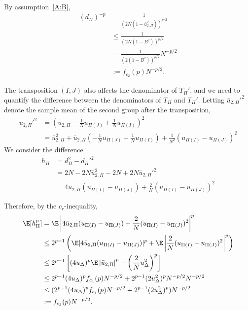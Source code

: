 By assumption~\eqref{A:B},
\begin{align}
  (d_{\Pi})^{-p} &= \frac{1}{(2N(1-\bar{u}_{2,\Pi}^2))^{p/2}} \nonumber \\
  &\leq \frac{1}{(2N(1-B^2))^{p/2}} \nonumber \\
  &= \frac{1}{(2(1-B^2))^{p/2}}N^{-p/2} \nonumber \\
  &:= f_{c_2}(p) N^{-p/2} \label{def:dp}.
\end{align}

The transposition $(I, J)$ also affects the denominator of $T_{\Pi}'$, and we need to quantify the
difference between the denominators of $T_{\Pi}$ and $T_{\Pi}'$.  Letting $\bar{u}_{2,\Pi}'^2$
denote the sample mean of the second group after the transposition,
\begin{align*}
  \bar{u}_{2,\Pi}'^2 &= \left ( \bar{u}_{2,\Pi}-\frac{1}{N}u_{\Pi(J)}+\frac{1}{N}u_{\Pi(I)} \right )^2 \\
  &= \bar{u}_{2,\Pi}^2 + \bar{u}_{2,\Pi} \left ( -\frac{1}{N}u_{\Pi(J)} +
      \frac{1}{N}u_{\Pi(I)} \right ) + \frac{1}{N^2}(u_{\Pi(I)} - u_{\Pi(J)})^2
\end{align*}
We consider the difference
\begin{align*}
  h_{\Pi} &= d_{\Pi}^2 - d_{\Pi}'^2 \\
  &= 2N - 2N \bar{u}_{2,\Pi}^2 - 2N + 2N\bar{u}_{2,\Pi}'^2 \\
  &= 4\bar{u}_{2,\Pi}(u_{\Pi(I)} - u_{\Pi(J)}) + \frac{2}{N}(u_{\Pi(I)} - u_{\Pi(J)})^2
\end{align*}

Therefore, by the $c_r$-inequality,
\begin{align}
  \E[h_{\Pi}^p] &= \E \left | 4\bar{u}_{2,\Pi}(u_{\Pi(I)}-u_{\Pi(J)}) +
      \frac{2}{N}(u_{\Pi(I)}-u_{\Pi(J)})^2 \right |^p \nonumber \\
  &\leq 2^{p-1} \left ( \E |4\bar{u}_{2,\Pi}(u_{\Pi(I)}-u_{\Pi(J)})|^p 
    + \E \left |\frac{2}{N}(u_{\Pi(I)}-u_{\Pi(J)})^2 \right |^p \right ) \nonumber \\
  &\leq 2^{p-1}\left [ (4u_{\Delta})^p \E \left | \bar{u}_{2,\Pi} \right |^p
    + \left ( \frac{2}{N}u_{\Delta}^2 \right )^p \right ] \nonumber \\
  &\leq 2^{p-1} (4u_{\Delta})^p f_{c_1}(p)N^{-p/2} +
  2^{p-1}(2u_{\Delta}^2)^pN^{-p/2}N^{-p/2} \nonumber \\
  &\leq (2^{p-1} (4u_{\Delta})^p f_{c_1}(p)N^{-p/2} +
  2^{p-1}(2u_{\Delta}^2)^p)N^{-p/2} \nonumber \\
  &:= f_{c_3}(p)N^{-p/2} \label{def:hp}.
\end{align}

